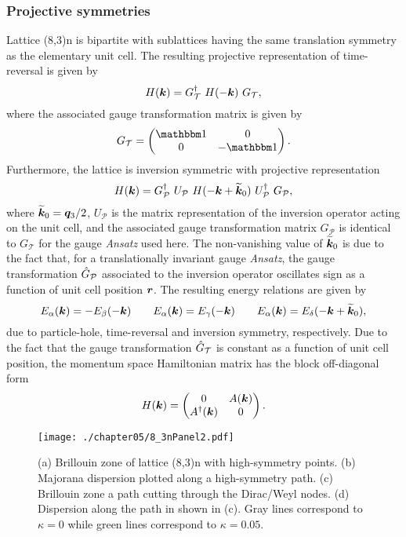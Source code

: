 \subsubsection{Projective symmetries}
%
%
Lattice (8,3)n is bipartite with sublattices having the same translation symmetry as the elementary unit cell.
The resulting projective representation of time-reversal is given by
%
\begin{equation}
	H(\bm{k}) = G^{\dagger}_{\mathcal{T}}~H(-\bm{k})~G_{\mathcal{T}},
\end{equation}
%
where the associated gauge transformation matrix is given by
%
\begin{equation}
	G_{\mathcal{T}} =
		\begin{pmatrix}
			\id & 0 \\
			0	& -\id
		\end{pmatrix}.
\end{equation}
%
Furthermore, the lattice is inversion symmetric with projective representation
%
\begin{equation}
	H(\bm{k}) = G^{\dagger}_{\mathcal{P}}~U_{\mathcal{P}}~H(-\bm{k} + \widetilde{\bm{k}}_0)~U^{\dagger}_{\mathcal{P}}~G_{\mathcal{P}},
\end{equation}
%
where $\widetilde{\bm{k}}_0 = \bm{q}_3/2$, $U_{\mathcal{P}}$ is the matrix representation of the inversion operator acting on the unit cell, and the associated gauge transformation matrix $G_{\mathcal{P}}$ is identical to $G_{\mathcal{T}}$  for the gauge \textit{Ansatz} used here.
The non-vanishing value of $\widetilde{\bm{k}}_0$ is due to the fact that, for a translationally invariant gauge \textit{Ansatz}, the gauge transformation $\hat{G}_{\mathcal{P}}$ associated to the inversion operator oscillates sign as a function of unit cell position $\bm{r}$.
The resulting energy relations are given by
%
\begin{equation}
	E_{\alpha}(\bm{k}) = -E_{\beta}(-\bm{k}) \qquad E_{\alpha}(\bm{k}) = E_{\gamma}(-\bm{k}) \qquad E_{\alpha}(\bm{k}) = E_{\delta}(-\bm{k} + \widetilde{\bm{k}}_0),
\end{equation}
%
due to particle-hole, time-reversal and inversion symmetry, respectively.
Due to the fact that the gauge transformation $\hat{G}_{\mathcal{T}}$ is constant as a function of unit cell position, the momentum space Hamiltonian matrix has the block off-diagonal form
%
\begin{equation}
	H(\bm{k}) =
		\begin{pmatrix}
			0			& A(\bm{k}) \\
			A^{\dagger}(\bm{k})	& 0
		\end{pmatrix}.
\end{equation}
%
%
\begin{figure}[tb]
	\centering
	\texttt{[image: ./chapter05/8\_3nPanel2.pdf]}
	\caption{
		(a) Brillouin zone of lattice (8,3)n with high-symmetry points.
		(b) Majorana dispersion plotted along a high-symmetry path.
		(c) Brillouin zone a path cutting through the Dirac/Weyl nodes.
		(d) Dispersion along the path in shown in (c).
		Gray lines correspond to $\kappa = 0$ while green lines correspond to $\kappa = 0.05$.
	}
	\label{fig:chapter05_8_3nPanel2}
\end{figure}
%


